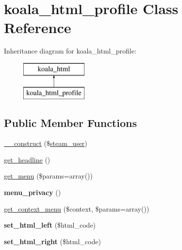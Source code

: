 \hypertarget{classkoala__html__profile}{
\section{koala\_\-html\_\-profile Class Reference}
\label{classkoala__html__profile}
}
Inheritance diagram for koala\_\-html\_\-profile:\begin{figure}[H]
\begin{center}
\leavevmode
\includegraphics[height=2.000000cm]{classkoala__html__profile}
\end{center}
\end{figure}
\subsection*{Public Member Functions}
\begin{DoxyCompactItemize}
\item 
\hyperlink{classkoala__html__profile_a25c2fae69573abbec8c1b6a32a4d4c88}{\_\-\_\-construct} (\$\hyperlink{classsteam__user}{steam\_\-user})
\item 
\hyperlink{classkoala__html__profile_aec4b1acf8dcb034bcbce1e5673f298cc}{get\_\-headline} ()
\item 
\hyperlink{classkoala__html__profile_a18e57f120de4f0865cc58c9bbbead202}{get\_\-menu} (\$params=array())
\item 
\hypertarget{classkoala__html__profile_a196c6015a7b1b77ae22b66f047a1eb8d}{
{\bfseries menu\_\-privacy} ()}
\label{classkoala__html__profile_a196c6015a7b1b77ae22b66f047a1eb8d}

\item 
\hyperlink{classkoala__html__profile_a0f6090f5e2311531e0a093927925da92}{get\_\-context\_\-menu} (\$context, \$params=array())
\item 
\hypertarget{classkoala__html__profile_a9d89b4430d115f57cc5e27fa1ca1a301}{
{\bfseries set\_\-html\_\-left} (\$html\_\-code)}
\label{classkoala__html__profile_a9d89b4430d115f57cc5e27fa1ca1a301}

\item 
\hypertarget{classkoala__html__profile_a1d4e8b89b85306e2ec391ed51bd293fd}{
{\bfseries set\_\-html\_\-right} (\$html\_\-code)}
\label{classkoala__html__profile_a1d4e8b89b85306e2ec391ed51bd293fd}

\end{DoxyCompactItemize}
